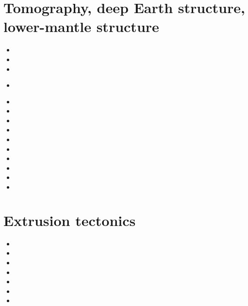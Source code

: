 \section{Tomography, deep Earth structure, lower-mantle structure}
\begin{scriptsize}
\begin{itemize}
\item[\nineteeneightyone] 
\item[\nineteenninetyone] 
\item[\nineteenninetythree] 
\item[\nineteenninetyeight] 
 \\
\item[\twothousandnine] 
\item[\twothousandthree] 
\item[\twothousandten] 
\item[\twothousandeleven]
\item[\twothousandtwelve]
\item[\twothousandthirteen] 
\item[\twothousandsixteen] 
\item[\twothousandeighteen] 
\item[\twothousandtwenty] 
\item[\twothousandtwentythree] 
\end{itemize}
\end{scriptsize}


\section{Extrusion tectonics}

\begin{scriptsize}
\begin{itemize}
\item[\nineteeneightytwo]
\item[\twothousandthree]
\item[\twothousandeleven]
\item[\twothousandfourteen]
\item[\twothousandsixteen]
\item[\twothousandnineteen]
\item[\twothousandtwentyone]
\end{itemize}
\end{scriptsize}

